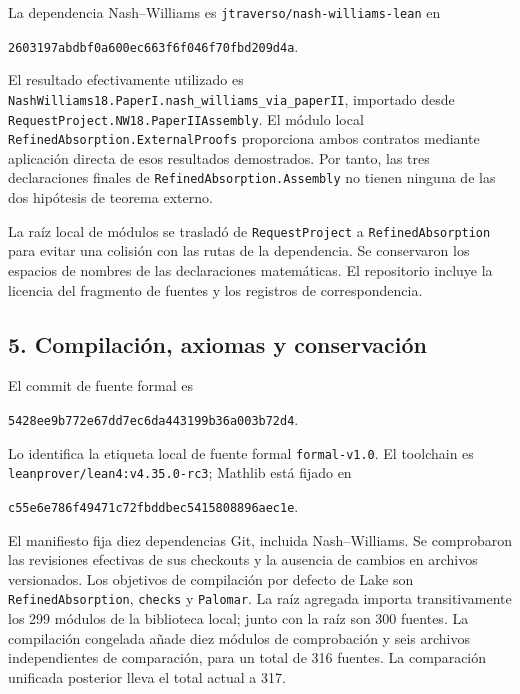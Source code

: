 \documentclass[spanish,11pt,a4paper]{article}
\begin{document}
La dependencia Nash--Williams es \texttt{jtraverso/\allowbreak{}nash-williams-lean} en

\texttt{2603197a\allowbreak{}bdbf0a60\allowbreak{}0ec663f6\allowbreak{}f046f70f\allowbreak{}bd209d4a}.

El resultado efectivamente utilizado es \texttt{Nash\allowbreak{}Williams18.\allowbreak{}Paper\allowbreak{}I.\allowbreak{}nash\_\allowbreak{}williams\_\allowbreak{}via\_\allowbreak{}paper\allowbreak{}II}, importado desde \texttt{Request\allowbreak{}Project.\allowbreak{}NW18.\allowbreak{}Paper\allowbreak{}IIAssembly}. El módulo local \texttt{Refined\allowbreak{}Absorption.\allowbreak{}External\allowbreak{}Proofs} proporciona ambos contratos mediante aplicación directa de esos resultados demostrados. Por tanto, las tres declaraciones finales de \texttt{Refined\allowbreak{}Absorption.\allowbreak{}Assembly} no tienen ninguna de las dos hipótesis de teorema externo.

La raíz local de módulos se trasladó de \texttt{Request\allowbreak{}Project} a \texttt{Refined\allowbreak{}Absorption} para evitar una colisión con las rutas de la dependencia. Se conservaron los espacios de nombres de las declaraciones matemáticas. El repositorio incluye la licencia del fragmento de fuentes y los registros de correspondencia.

\subsection{5. Compilación, axiomas y conservación}\label{compilaciuxf3n-axiomas-y-conservaciuxf3n}

El commit de fuente formal es

\texttt{5428ee9b\allowbreak{}772e67dd\allowbreak{}7ec6da44\allowbreak{}3199b36a\allowbreak{}003b72d4}.

Lo identifica la etiqueta local de fuente formal \texttt{formal-v1.\allowbreak{}0}. El toolchain es \texttt{leanprover/\allowbreak{}lean4:v4.\allowbreak{}35.\allowbreak{}0-rc3}; Mathlib está fijado en

\texttt{c55e6e78\allowbreak{}6f49471c\allowbreak{}72fbddbe\allowbreak{}c5415808\allowbreak{}896aec1e}.

El manifiesto fija diez dependencias Git, incluida Nash--Williams. Se comprobaron las revisiones efectivas de sus checkouts y la ausencia de cambios en archivos versionados. Los objetivos de compilación por defecto de Lake son \texttt{Refined\allowbreak{}Absorption}, \texttt{checks} y \texttt{Palomar}. La raíz agregada importa transitivamente los 299 módulos de la biblioteca local; junto con la raíz son 300 fuentes. La compilación congelada añade diez módulos de comprobación y seis archivos independientes de comparación, para un total de 316 fuentes. La comparación unificada posterior lleva el total actual a 317.
\end{document}
